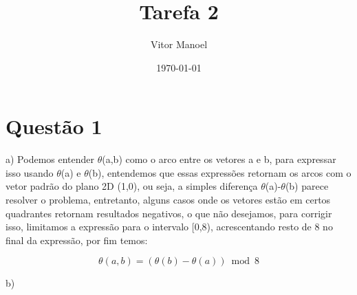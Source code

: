 \documentclass{article}
\title{Tarefa 2}
\author{Vitor Manoel}
\date{\today}
\begin{document}
\maketitle

\section*{Questão 1}

a) Podemos entender $\theta$(a,b) como o arco entre os vetores a e b, para expressar isso usando $\theta$(a) e $\theta$(b), 
entendemos que essas expressões retornam os arcos com o vetor padrão do plano 2D (1,0), ou seja, a simples diferença $\theta$(a)-$\theta$(b)
parece resolver o problema, entretanto, alguns casos onde os vetores estão em certos quadrantes retornam resultados negativos, o que não desejamos,
para corrigir isso, limitamos a expressão para o intervalo [0,8), acrescentando resto de 8 no final da expressão, por fim temos:

\[
\theta(a, b) = (\theta(b) - \theta(a)) \bmod 8
\]

b)
\end{document}
